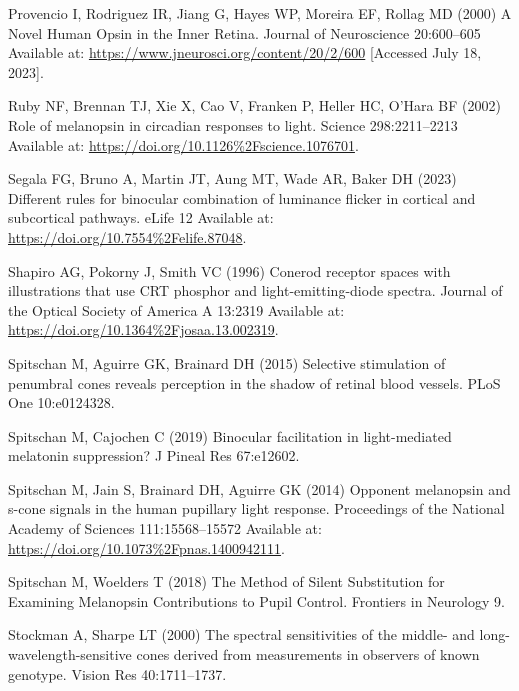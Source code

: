 \documentclass[
]{article}
\begin{document}
\leavevmode\hypertarget{ref-Provencio2000}{}%
Provencio I, Rodriguez IR, Jiang G, Hayes WP, Moreira EF, Rollag MD (2000) A Novel Human Opsin in the Inner Retina. Journal of Neuroscience 20:600--605 Available at: \url{https://www.jneurosci.org/content/20/2/600} {[}Accessed July 18, 2023{]}.

\leavevmode\hypertarget{ref-Ruby2002}{}%
Ruby NF, Brennan TJ, Xie X, Cao V, Franken P, Heller HC, O'Hara BF (2002) Role of melanopsin in circadian responses to light. Science 298:2211--2213 Available at: \url{https://doi.org/10.1126\%2Fscience.1076701}.

\leavevmode\hypertarget{ref-Segala2023}{}%
Segala FG, Bruno A, Martin JT, Aung MT, Wade AR, Baker DH (2023) Different rules for binocular combination of luminance flicker in cortical and subcortical pathways. eLife 12 Available at: \url{https://doi.org/10.7554\%2Felife.87048}.

\leavevmode\hypertarget{ref-Shapiro1996}{}%
Shapiro AG, Pokorny J, Smith VC (1996) Conerod receptor spaces with illustrations that use CRT phosphor and light-emitting-diode spectra. Journal of the Optical Society of America A 13:2319 Available at: \url{https://doi.org/10.1364\%2Fjosaa.13.002319}.

\leavevmode\hypertarget{ref-Spitschan2015}{}%
Spitschan M, Aguirre GK, Brainard DH (2015) Selective stimulation of penumbral cones reveals perception in the shadow of retinal blood vessels. PLoS One 10:e0124328.

\leavevmode\hypertarget{ref-Spitschan2019}{}%
Spitschan M, Cajochen C (2019) Binocular facilitation in light-mediated melatonin suppression? J Pineal Res 67:e12602.

\leavevmode\hypertarget{ref-Spitschan2014}{}%
Spitschan M, Jain S, Brainard DH, Aguirre GK (2014) Opponent melanopsin and s-cone signals in the human pupillary light response. Proceedings of the National Academy of Sciences 111:15568--15572 Available at: \url{https://doi.org/10.1073\%2Fpnas.1400942111}.

\leavevmode\hypertarget{ref-Spitschan2018}{}%
Spitschan M, Woelders T (2018) The Method of Silent Substitution for Examining Melanopsin Contributions to Pupil Control. Frontiers in Neurology 9.

\leavevmode\hypertarget{ref-Stockman2000}{}%
Stockman A, Sharpe LT (2000) The spectral sensitivities of the middle- and long-wavelength-sensitive cones derived from measurements in observers of known genotype. Vision Res 40:1711--1737.
\end{document}
